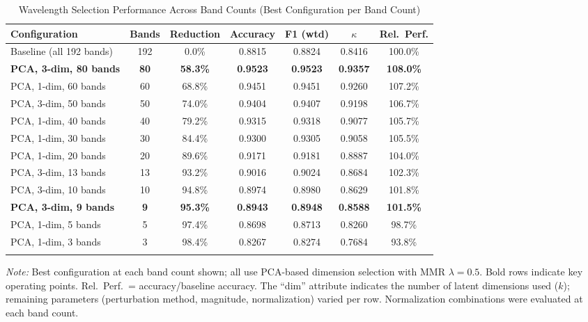 \begin{table}[!t]
\centering
\caption{Wavelength Selection Performance Across Band Counts (Best Configuration per Band Count)}
\label{tab:main_results}
\begin{tabular}{@{}lcccccc@{}}
\toprule
\textbf{Configuration} & \textbf{Bands} & \textbf{Reduction} & \textbf{Accuracy} & \textbf{F1 (wtd)} & \textbf{$\kappa$} & \textbf{Rel.\ Perf.} \\
\midrule
Baseline (all 192 bands) & 192 & 0.0\% & 0.8815 & 0.8824 & 0.8416 & 100.0\% \\
\midrule
\textbf{PCA, 3-dim, 80 bands} & \textbf{80} & \textbf{58.3\%} & \textbf{0.9523} & \textbf{0.9523} & \textbf{0.9357} & \textbf{108.0\%} \\
PCA, 1-dim, 60 bands & 60 & 68.8\% & 0.9451 & 0.9451 & 0.9260 & 107.2\% \\
PCA, 3-dim, 50 bands & 50 & 74.0\% & 0.9404 & 0.9407 & 0.9198 & 106.7\% \\
PCA, 1-dim, 40 bands & 40 & 79.2\% & 0.9315 & 0.9318 & 0.9077 & 105.7\% \\
PCA, 1-dim, 30 bands & 30 & 84.4\% & 0.9300 & 0.9305 & 0.9058 & 105.5\% \\
PCA, 1-dim, 20 bands & 20 & 89.6\% & 0.9171 & 0.9181 & 0.8887 & 104.0\% \\
PCA, 3-dim, 13 bands & 13 & 93.2\% & 0.9016 & 0.9024 & 0.8684 & 102.3\% \\
PCA, 3-dim, 10 bands & 10 & 94.8\% & 0.8974 & 0.8980 & 0.8629 & 101.8\% \\
\textbf{PCA, 3-dim, 9 bands} & \textbf{9} & \textbf{95.3\%} & \textbf{0.8943} & \textbf{0.8948} & \textbf{0.8588} & \textbf{101.5\%} \\
PCA, 1-dim, 5 bands & 5 & 97.4\% & 0.8698 & 0.8713 & 0.8260 & 98.7\% \\
PCA, 1-dim, 3 bands & 3 & 98.4\% & 0.8267 & 0.8274 & 0.7684 & 93.8\% \\
\bottomrule
\vspace{0.2em}
\end{tabular}
\parbox{\textwidth}{\small\textit{Note:} Best configuration at each band count shown; all use PCA-based dimension selection with MMR $\lambda = 0.5$. Bold rows indicate key operating points. Rel.\ Perf.\ = accuracy/baseline accuracy. The ``dim'' attribute indicates the number of latent dimensions used ($k$); remaining parameters (perturbation method, magnitude, normalization) varied per row. Normalization combinations were evaluated at each band count.}
\end{table}

